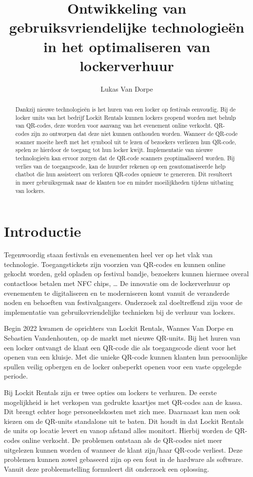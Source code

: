 \documentclass{hogent-article}
\title{Ontwikkeling van gebruiksvriendelijke technologieën in het optimaliseren van lockerverhuur}
\author{Lukas Van Dorpe}
\begin{document}
\begin{abstract}
  Dankzij nieuwe technologieën is het huren van een locker op festivals eenvoudig. Bij de locker units van het bedrijf Lockit Rentals kunnen lockers geopend worden met behulp van QR-codes, deze worden voor aanvang van het evenement online verkocht. QR-codes zijn zo ontworpen dat deze niet kunnen onthouden worden. Wanneer de QR-code scanner moeite heeft met het symbool uit te lezen of bezoekers verliezen hun QR-code, spelen ze hierdoor de toegang tot hun locker kwijt. Implementatie van nieuwe technologieën kan ervoor zorgen dat de QR-code scanners geoptimaliseerd worden. Bij verlies van de toegangscode, kan de huurder rekenen op een geautomatiseerde help chatbot die hun assisteert om verloren QR-codes opnieuw te genereren. Dit resulteert in meer gebruiksgemak naar de klanten toe en minder moeilijkheden tijdens uitbating van lockers.
  
\end{abstract}

\tableofcontents

% 


\section{Introductie}%
\label{sec:introductie}

Tegenwoordig staan festivals en evenementen heel ver op het vlak van technologie. Toegangstickets zijn voorzien van QR-codes en kunnen online gekocht worden, geld opladen op festival bandje, bezoekers kunnen hiermee overal contactloos betalen met NFC chips, … De innovatie om de lockerverhuur op evenementen te digitaliseren en te moderniseren komt vanuit de veranderde noden en behoeften van festivalgangers. Onderzoek zal doeltreffend zijn voor de implementatie van gebruiksvriendelijke technieken bij de verhuur van lockers.

Begin 2022 kwamen de oprichters van Lockit Rentals, Wannes Van Dorpe en Sebastien Vandenhouten, op de markt met nieuwe QR-units. Bij het huren van een locker ontvangt de klant een QR-code die als toegangscode dient voor het openen van een kluisje. Met die unieke QR-code kunnen klanten hun persoonlijke spullen veilig opbergen en de locker onbeperkt openen voor een vaste opgelegde periode. 

Bij Lockit Rentals zijn er twee opties om lockers te verhuren. De eerste mogelijkheid is het verkopen van gedrukte kaartjes met QR-codes aan de kassa. Dit brengt echter hoge personeelskosten met zich mee. Daarnaast kan men ook kiezen om de QR-units standalone uit te baten. Dit houdt in dat Lockit Rentals de units op locatie levert en vanop afstand alles monitort. Hierbij worden de QR-codes online verkocht. De problemen ontstaan als de QR-codes niet meer uitgelezen kunnen worden of wanneer de klant zijn/haar QR-code verliest. Deze problemen kunnen zowel gebaseerd zijn op een fout in de hardware als software. Vanuit deze probleemstelling formuleert dit onderzoek een oplossing.  
\end{document}
